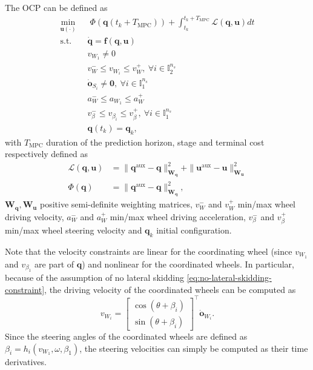 The OCP can be defined as 
\begin{equation*}
    \begin{aligned}
        \min_{\bm{u}(\cdot)} \;\;
            & \; \Phi(\bm{q}(t_k + T_{\mathrm{MPC}})) + \int_{t_k}^{t_k + T_{\mathrm{MPC}}} \mathcal{L}(\bm{q}, \bm{u}) dt \\
            \text{s.t. } & \dot{\bm{q}} = \bm{f}(\bm{q}, \bm{u}) \\
                         & v_{W_1} \ne 0 \\
                         & v_W^- \le v_{W_i} \le v_W^+,\:  \forall i \in \mathbb{I}_2^{n_s} \\
                         & \dot{\bm{o}}_{S_i} \ne \bm{0},\: \forall i \in \mathbb{I}_1^{n_s} \\
                         & a_W^- \le a_{W_1} \le a_W^+ \\
                         & v_{\beta}^- \le v_{\beta_i} \le v_{\beta}^+,\: \forall i \in \mathbb{I}_1^{n_s} \\
                         & \bm{q}(t_k) = \bm{q}_k,
    \end{aligned}
\end{equation*}
with $T_{\mathrm{MPC}}$ duration of the prediction horizon, stage and terminal cost respectively defined as
\begin{align*}
    \mathcal{L}(\bm{q}, \bm{u}) &= \|\bm{q}^{\mathrm{aux}} - \bm{q}\|_{\bm{W_q}}^2 + \|\bm{u}^{\mathrm{aux}} - \bm{u}\|_{\bm{W_u}}^2 \\
    \Phi(\bm{q}) &= \|\bm{q}^{\mathrm{aux}} - \bm{q}\|_{\bm{W_q}}^2,
\end{align*}
$\bm{W_q}, \bm{W_u}$ positive semi-definite weighting matrices, $v_W^-$ and $v_W^+$ min/max wheel driving velocity, $a_W^-$ and $a_W^+$ min/max wheel driving acceleration, $v_{\beta}^-$ and $v_{\beta}^+$  min/max  wheel steering velocity and $\bm{q}_k$ initial configuration.

Note that the velocity constraints are linear for the coordinating wheel (since $v_{W_1}$ and $v_{\beta_1}$ are part of $\bm{q}$) and nonlinear for the coordinated wheels. In particular, because of the assumption of no lateral skidding \eqref{eq:no-lateral-skidding-constraint}, the driving velocity of the coordinated wheels can be computed as
\begin{equation*}
    v_{W_i} = 
    \begin{bmatrix}
        \cos(\theta + \beta_i) \\
        \sin(\theta + \beta_i)
    \end{bmatrix}^\top \dot{\bm{o}}_{W_i}.
\end{equation*}
Since the steering angles of the coordinated wheels are defined as $\beta_i=h_i(v_{W_1}, \omega, \beta_1)$, the steering velocities can simply be computed as their time derivatives.

